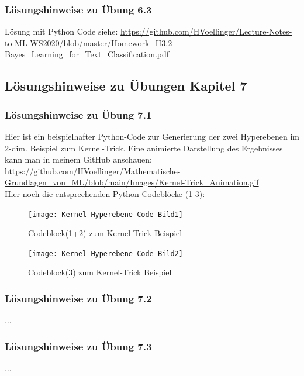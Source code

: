 \documentclass[12pt]{article}
\begin{document}
\subsubsection{Lösungshinweise zu Übung 6.3}

Lösung mit Python Code siehe: \url{https://github.com/HVoellinger/Lecture-Notes-to-ML-WS2020/blob/master/Homework_H3.2-Bayes_Learning_for_Text_Classification.pdf}
\\[0.2cm]

\newpage

\subsection{Lösungshinweise zu Übungen Kapitel 7}

\subsubsection{Lösungshinweise zu Übung 7.1}
Hier ist ein beispielhafter Python-Code zur Generierung der zwei Hyperebenen im 2-dim. Beispiel zum Kernel-Trick. Eine animierte Darstellung des Ergebnisses kann man in meinem GitHub anschauen: \\[0.3cm]
\url{https://github.com/HVoellinger/Mathematische-Grundlagen_von_ML/blob/main/Images/Kernel-Trick_Animation.gif} \\[0.3cm]
%
Hier noch die entsprechenden Python Codeblöcke (1-3):
%
\begin{figure}[htp]
  \centering
  \hspace*{-0.5cm} 
  \texttt{[image: Kernel-Hyperebene-Code-Bild1]}
  \caption{Codeblock(1+2) zum Kernel-Trick Beispiel}
  \label{fig:SVM_Ebenen}
\end{figure}
%
\begin{figure}[htp]
  \centering
  \hspace*{-0.5cm} 
  \texttt{[image: Kernel-Hyperebene-Code-Bild2]}
  \caption{Codeblock(3) zum Kernel-Trick Beispiel}
  \label{fig:SVM_Ebenen}
\end{figure}
%
\newpage
\subsubsection{Lösungshinweise zu Übung 7.2} 
... \\[0.8cm]
\subsubsection{Lösungshinweise zu Übung 7.3}
... \\[0.8cm]
\newpage
\end{document}
